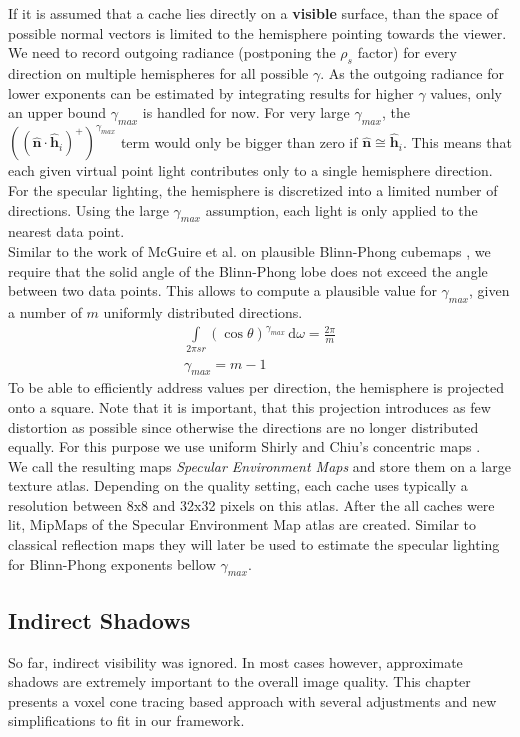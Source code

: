\documentclass[thesis.tex]{subfiles}
\begin{document}
If it is assumed that a cache lies directly on a \textbf{visible} surface, than the space of possible normal vectors is limited to the hemisphere pointing towards the viewer.
We need to record outgoing radiance (postponing the $\rho_s$ factor) for every direction on multiple hemispheres for all possible $\gamma$.
As the outgoing radiance for lower exponents can be estimated by integrating results for higher $\gamma$ values, only an upper bound $\gamma_{max}$ is handled for now.
For very large $\gamma_{max}$, the $((\hat{\mathbf{n}} \cdot \hat{\mathbf{h}}_i)^+)^{\gamma_{max}}$ term would only be bigger than zero if $\hat{\mathbf{n}} \cong \hat{\mathbf{h}}_i$.
This means that each given virtual point light contributes only to a single hemisphere direction.
For the specular lighting, the hemisphere is discretized into a limited number of directions.
Using the large $\gamma_{max}$ assumption, each light is only applied to the nearest data point.\\
%
Similar to the work of McGuire et al. on plausible Blinn-Phong cubemaps \cite{bib:envmipmap}, we require that the solid angle of the Blinn-Phong lobe does not exceed the angle between two data points.
This allows to compute a plausible value for $\gamma_{max}$, given a number of $m$ uniformly distributed directions.
\begin{align}
\int\limits_{2\pi sr} (\cos\theta)^{\gamma_{max}}  \,\mathrm{d}\omega = \frac{2\pi}{m}\\
\gamma_{max} = m-1
\end{align}
%
To be able to efficiently address values per direction, the hemisphere is projected onto a square.
Note that it is important, that this projection introduces as few distortion as possible since otherwise the directions are no longer distributed equally.
For this purpose we use uniform Shirly and Chiu's concentric maps \cite{bib:concentricmaps}.\\ 
We call the resulting maps \emph{Specular Environment Maps} and store them on a large texture atlas.
Depending on the quality setting, each cache uses typically a resolution between 8x8 and 32x32 pixels on this atlas.
After the all caches were lit, MipMaps of the Specular Environment Map atlas are created.
Similar to classical reflection maps \cite[p.~308]{bib:RealtimeRenderingBook} they will later be used to estimate the specular lighting for Blinn-Phong exponents bellow $\gamma_{max}$.

\subsection{Indirect Shadows}
So far, indirect visibility was ignored.
In most cases however, approximate shadows are extremely important to the overall image quality. 
This chapter presents a voxel cone tracing based approach with several adjustments and new simplifications to fit in our framework.
\end{document}
